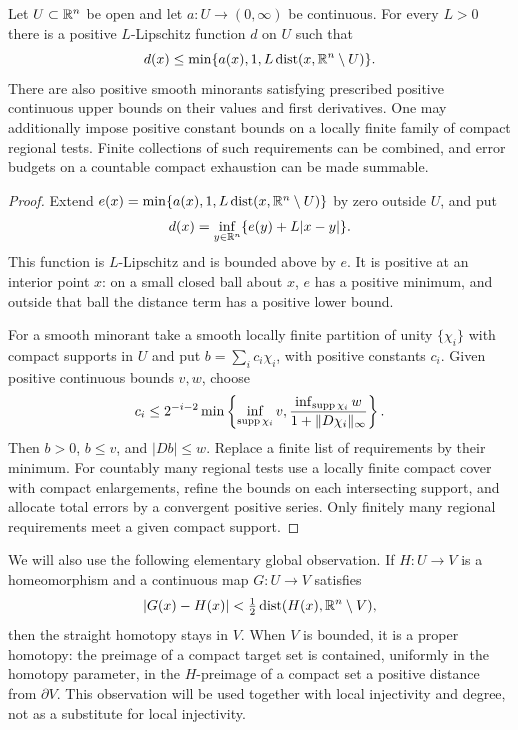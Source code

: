 \begin{lemma}\label{pre:local-tolerances}
Let $U\subset\mathbb R^n$ be open and let $a:U\to(0,\infty)$ be continuous. For every $L>0$ there is a positive $L$-Lipschitz function $d$ on $U$ such that
\[
 d(x)\le \min\{a(x),1,L\operatorname{dist}(x,\mathbb R^n\setminus U)\}.
\]
There are also positive smooth minorants satisfying prescribed positive continuous upper bounds on their values and first derivatives. One may additionally impose positive constant bounds on a locally finite family of compact regional tests. Finite collections of such requirements can be combined, and error budgets on a countable compact exhaustion can be made summable.
\end{lemma}
\begin{proof}
Extend $e(x)=\min\{a(x),1,L\operatorname{dist}(x,\mathbb R^n\setminus U)\}$ by zero outside $U$, and put
\[
 d(x)=\inf_{y\in\mathbb R^n}\{e(y)+L|x-y|\}.
\]
This function is $L$-Lipschitz and is bounded above by $e$. It is positive at an interior point $x$: on a small closed ball about $x$, $e$ has a positive minimum, and outside that ball the distance term has a positive lower bound.

For a smooth minorant take a smooth locally finite partition of unity $\{\chi_i\}$ with compact supports in $U$ and put $b=\sum_i c_i\chi_i$, with positive constants $c_i$. Given positive continuous bounds $v,w$, choose
\[
 c_i\le 2^{-i-2}\min\left\{
 \inf_{\operatorname{supp}\chi_i}v,
 \frac{\inf_{\operatorname{supp}\chi_i}w}{1+\|D\chi_i\|_\infty}
 \right\}.
\]
Then $b>0$, $b\le v$, and $|Db|\le w$. Replace a finite list of requirements by their minimum. For countably many regional tests use a locally finite compact cover with compact enlargements, refine the bounds on each intersecting support, and allocate total errors by a convergent positive series. Only finitely many regional requirements meet a given compact support.
\end{proof}

We will also use the following elementary global observation. If $H:U\to V$ is a homeomorphism and a continuous map $G:U\to V$ satisfies
\[
 |G(x)-H(x)|<\tfrac12\operatorname{dist}(H(x),\mathbb R^n\setminus V),
\]
then the straight homotopy stays in $V$. When $V$ is bounded, it is a proper homotopy: the preimage of a compact target set is contained, uniformly in the homotopy parameter, in the $H$-preimage of a compact set a positive distance from $\partial V$. This observation will be used together with local injectivity and degree, not as a substitute for local injectivity.
